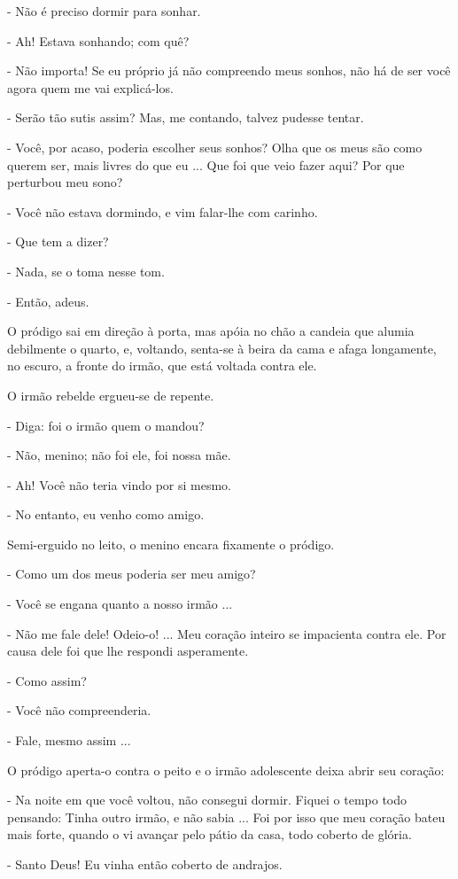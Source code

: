 - Não é preciso dormir para sonhar.

- Ah! Estava sonhando; com quê?

- Não importa! Se eu próprio já não compreendo meus sonhos, não há de
ser você agora quem me vai explicá-los.

- Serão tão sutis assim? Mas, me contando, talvez pudesse tentar.

- Você, por acaso, poderia escolher seus sonhos? Olha que os meus são
como querem ser, mais livres do que eu ... Que foi que veio fazer aqui?
Por que perturbou meu sono?

- Você não estava dormindo, e vim falar-lhe com carinho.

- Que tem a dizer?

- Nada, se o toma nesse tom.

- Então, adeus.

O pródigo sai em direção à porta, mas apóia no chão a candeia que alumia
debilmente o quarto, e, voltando, senta-se à beira da cama e afaga
longamente, no escuro, a fronte do irmão, que está voltada contra ele.

O irmão rebelde ergueu-se de repente.

- Diga: foi o irmão quem o mandou?

- Não, menino; não foi ele, foi nossa mãe.

- Ah! Você não teria vindo por si mesmo.

- No entanto, eu venho como amigo.

Semi-erguido no leito, o menino encara fixamente o pródigo.

- Como um dos meus poderia ser meu amigo?

- Você se engana quanto a nosso irmão ...

- Não me fale dele! Odeio-o! ... Meu coração inteiro se impacienta
contra ele. Por causa dele foi que lhe respondi asperamente.

- Como assim?

- Você não compreenderia.

- Fale, mesmo assim ...

O pródigo aperta-o contra o peito e o irmão adolescente deixa abrir seu
coração:

- Na noite em que você voltou, não consegui dormir. Fiquei o tempo todo
pensando: Tinha outro irmão, e não sabia ... Foi por isso que meu
coração bateu mais forte, quando o vi avançar pelo pátio da casa, todo
coberto de glória.

- Santo Deus! Eu vinha então coberto de andrajos.

